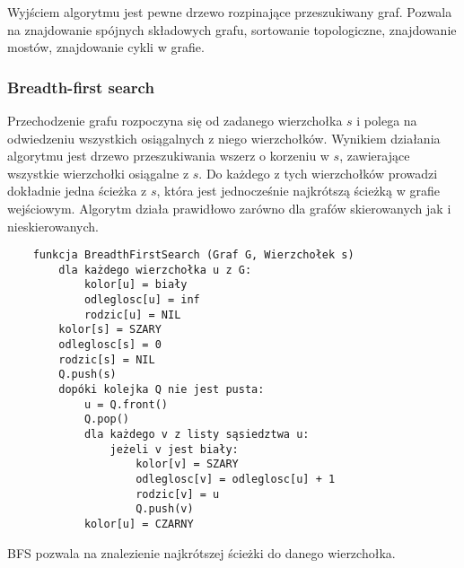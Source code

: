 Wyjściem algorytmu jest pewne drzewo rozpinające przeszukiwany graf.
Pozwala na znajdowanie spójnych składowych grafu, sortowanie topologiczne, znajdowanie mostów, znajdowanie cykli w grafie.

\subsubsection{Breadth-first search}

Przechodzenie grafu rozpoczyna się od zadanego wierzchołka $s$ i polega na odwiedzeniu wszystkich osiągalnych z niego wierzchołków.
Wynikiem działania algorytmu jest drzewo przeszukiwania wszerz o korzeniu w $s$, zawierające wszystkie wierzchołki osiągalne z $s$.
Do każdego z tych wierzchołków prowadzi dokładnie jedna ścieżka z $s$, która jest jednocześnie najkrótszą ścieżką w grafie wejściowym.
Algorytm działa prawidłowo zarówno dla grafów skierowanych jak i nieskierowanych. \\

\begin{samepage}
    \begin{verbatim}
    funkcja BreadthFirstSearch (Graf G, Wierzchołek s)
        dla każdego wierzchołka u z G:
            kolor[u] = biały
            odleglosc[u] = inf
            rodzic[u] = NIL
        kolor[s] = SZARY
        odleglosc[s] = 0
        rodzic[s] = NIL
        Q.push(s)
        dopóki kolejka Q nie jest pusta:
            u = Q.front()
            Q.pop()
            dla każdego v z listy sąsiedztwa u:
                jeżeli v jest biały:
                    kolor[v] = SZARY
                    odleglosc[v] = odleglosc[u] + 1
                    rodzic[v] = u
                    Q.push(v)
            kolor[u] = CZARNY
    \end{verbatim}
\end{samepage}

BFS pozwala na znalezienie najkrótszej ścieżki do danego wierzchołka.
